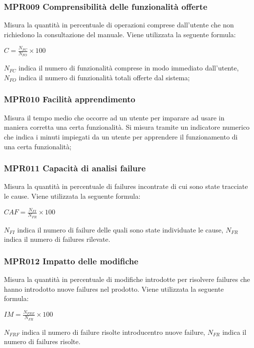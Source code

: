 \subsubsection{MPR009 Comprensibilità  delle funzionalità offerte}
Misura la quantità in percentuale di operazioni comprese dall’utente che non richiedono la
consultazione del manuale. Viene utilizzata la seguente formula:
\begin{center}{$C=\frac{N_{FC}}{N_{FO}}\times 100$}\end{center}
${N_{FC}}$ indica il numero di funzionalità comprese in modo immediato dall'utente, ${N_{FO}}$ indica il numero di funzionalità totali offerte dal sistema;
	
\subsubsection{MPR010 Facilità apprendimento}
Misura il tempo medio che occorre ad un utente per imparare ad usare in maniera corretta
una certa funzionalità. Si misura tramite un indicatore numerico che indica i minuti
impiegati da un utente per apprendere il funzionamento di una certa funzionalità;

\subsubsection{MPR011 Capacità di analisi failure}
Misura la quantità in percentuale di failures incontrate di cui sono state tracciate le cause. Viene
utilizzata la seguente formula:
\begin{center}{$CAF=\frac{N_{FI}}{N_{FR}}\times 100 $}\end{center}
${N_{FI}}$ indica il numero di failure delle quali sono state individuate le cause, ${N_{FR}}$ indica il numero di failures rilevate.

\subsubsection{MPR012 Impatto delle modifiche}
Misura la quantità in percentuale di modifiche introdotte per risolvere failures che hanno introdotto nuove failures nel prodotto. Viene utilizzata la seguente formula:
\begin{center}{$IM=\frac{N_{FRE}}{N_{FR}}\times 100 $}\end{center}
${N_{FRF}}$ indica il numero di failure risolte introducentro nuove failure, ${N_{FR}}$ indica il numero di failures risolte.


